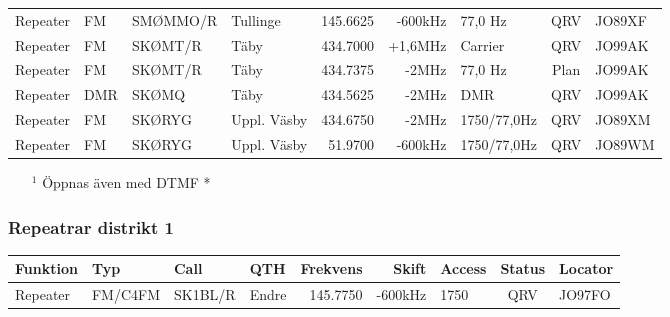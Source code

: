 \begin{landscape}
\begin{longtable}{llllrrlcl}
	Repeater          & FM           & SMØMMO/R      & Tullinge     & 145.6625          & -600kHz        & 77,0 Hz         & QRV             & JO89XF           \\
	Repeater          & FM           & SKØMT/R       & Täby         & 434.7000          & +1,6MHz        & Carrier         & QRV             & JO99AK           \\
	Repeater          & FM           & SKØMT/R       & Täby         & 434.7375          & -2MHz          & 77,0 Hz         & Plan            & JO99AK           \\
	Repeater          & DMR          & SKØMQ         & Täby         & 434.5625          & -2MHz          & DMR             & QRV             & JO99AK           \\
	Repeater          & FM           & SKØRYG        & Uppl. Väsby  & 434.6750          & -2MHz          & 1750/77,0Hz     & QRV             & JO89XM           \\
	Repeater          & FM           & SKØRYG        & Uppl. Väsby  & 51.9700           & -600kHz        & 1750/77,0Hz     & QRV             & JO89WM
\end{longtable}
\begin{itemize}
	\item[$^1$] Öppnas även med DTMF *
\end{itemize}
\normalsize

\clearpage

\subsubsection{Repeatrar distrikt 1}
\footnotesize
\begin{longtable}{llllrrlcl}
\textbf{Funktion} & \textbf{Typ} & \textbf{Call} & \textbf{QTH} & \textbf{Frekvens} & \textbf{Skift} & \textbf{Access} & \textbf{Status} & \textbf{Locator} \\ \hline \endhead
Repeater          & FM/C4FM      & SK1BL/R       & Endre	& 145.7750          & -600kHz        & 1750            & QRV             & JO97FO           \\
\end{longtable}
\normalsize


\end{landscape}
